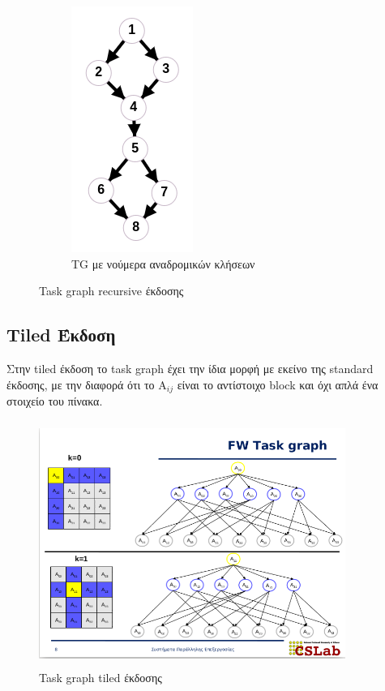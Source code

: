 \documentclass{article}
\newcommand\e[1]{\foreignlanguage{english}{#1}}
\begin{document}
\begin{figure}[H]
\begin{subfigure}{.35\textwidth}
  \includegraphics[width=.4\linewidth]{../3_images/recursivecalls.png}
  \caption{\e{TG} με νούμερα αναδρομικών κλήσεων}
  \label{fig:sub2}
\end{subfigure}
\caption{\e{Task graph recursive} έκδοσης}
\label{fig:test}
\end{figure}

\newpage
\subsection{\e{Tiled} Έκδοση}
Στην \e{tiled} έκδοση το \e{task graph} έχει την ίδια μορφή με εκείνο της \e{standard} έκδοσης, με την διαφορά ότι το A$_{ij}$ είναι το αντίστοιχο \e{block} και όχι απλά ένα στοιχείο του πίνακα.
\begin{figure}[H]
  \centering
  \includegraphics[width=10cm, height=8cm]{../3_images/fw.png}
  \caption{\e{Task graph tiled} έκδοσης}
\end{figure}
\end{document}
